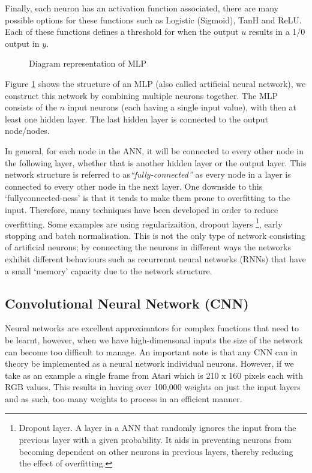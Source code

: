 Finally, each neuron has an activation function associated, there are many possible options for these functions such as Logistic (Sigmoid), TanH and ReLU. Each of these functions defines a threshold for when the output $u$ results in a 1/0 output in $y$.

\begin{figure}[ht!]
	\centering
	\caption{Diagram representation of MLP} \label{fig:mlp}
\end{figure}

Figure \ref{fig:mlp} shows the structure of an MLP (also called artificial neural network), we construct this network by combining multiple neurons together. The MLP consists of the $n$ input neurons (each having a single input value), with then at least one hidden layer. The last hidden layer is connected to the output node/nodes.

In general, for each node in the ANN, it will be connected to every other node in the following layer, whether that is another hidden layer or the output layer. This network structure is referred to as\textit{``fully-connected''} as every node in a layer is connected to every other node in the next layer. One downside to this `fullyconnected-ness' is that it tends to make them prone to overfitting to the input. Therefore, many techniques have been developed in order to reduce overfitting. Some examples are using regularizaition, dropout layers \footnote{Dropout layer. A layer in a ANN that randomly ignores the input from the previous layer with a given probability. It aids in preventing neurons from becoming dependent on other neurons in previous layers, thereby reducing the effect of overfitting.}, early stopping and batch normalisation. This is not the only type of network consisting of artificial neurons; by connecting the neurons in different ways the networks exhibit different behaviours such as recurrennt neural networks (RNNs) that have a small `memory' capacity due to the network structure.

\subsection{Convolutional Neural Network (CNN)}
\label{dsgn:sec:dl:cnn}
Neural networks are excellent approximators for complex functions that need to be learnt, however, when we have high-dimensonal inputs the size of the network can become too difficult to manage. An important note is that any CNN can in theory be implemented as a neural network individual neurons. However, if we take as an example a single frame from Atari which is 210 x 160 pixels each with RGB values. This results in having over 100,000 weights on just the input layers and as such, too many weights to process in an efficient manner.

